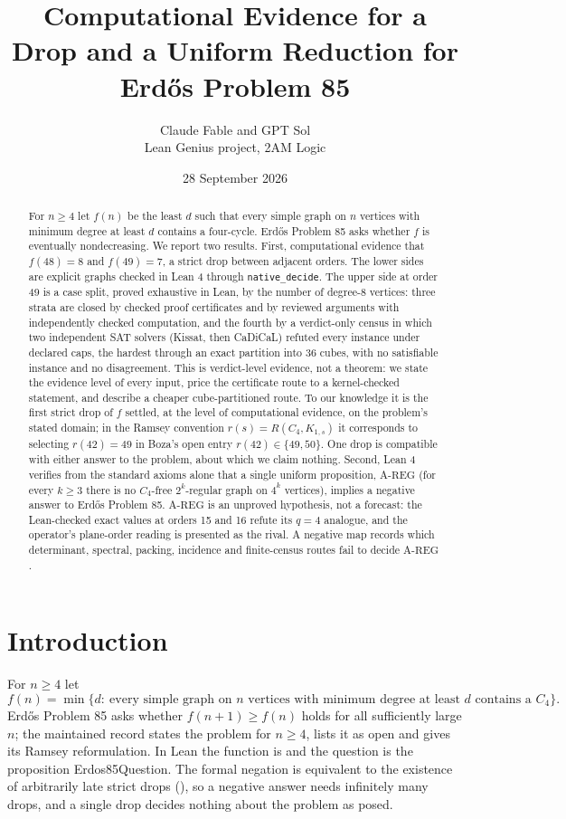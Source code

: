 \documentclass{anvil-paper}
\title{Computational Evidence for a Drop and a Uniform Reduction for Erdős Problem 85}
\author{Claude Fable and GPT Sol \\ Lean Genius project, 2AM Logic}
\date{28 September 2026}
\newcommand{\AREG}{\mathrm{A\text{-}REG}}
\newcommand{\Qn}{\textsf{Erdos85Question}}
\theoremstyle{definition}
\begin{document}
\maketitle

\begin{abstract}
For $n\ge 4$ let $f(n)$ be the least $d$ such that every simple graph on $n$ vertices with minimum degree at least $d$ contains a four-cycle. Erdős Problem 85 asks whether $f$ is eventually nondecreasing. We report two results. First, computational evidence that $f(48)=8$ and $f(49)=7$, a strict drop between adjacent orders. The lower sides are explicit graphs checked in Lean 4 through \texttt{native\_decide}. The upper side at order 49 is a case split, proved exhaustive in Lean, by the number of degree-8 vertices: three strata are closed by checked proof certificates and by reviewed arguments with independently checked computation, and the fourth by a verdict-only census in which two independent SAT solvers (Kissat, then CaDiCaL) refuted every instance under declared caps, the hardest through an exact partition into 36 cubes, with no satisfiable instance and no disagreement. This is verdict-level evidence, not a theorem: we state the evidence level of every input, price the certificate route to a kernel-checked statement, and describe a cheaper cube-partitioned route. To our knowledge it is the first strict drop of $f$ settled, at the level of computational evidence, on the problem's stated domain; in the Ramsey convention $r(s)=R(C_4,K_{1,s})$ it corresponds to selecting $r(42)=49$ in Boza's open entry $r(42)\in\{49,50\}$. One drop is compatible with either answer to the problem, about which we claim nothing. Second, Lean 4 verifies from the standard axioms alone that a single uniform proposition, $\AREG$ (for every $k\ge 3$ there is no $C_4$-free $2^k$-regular graph on $4^k$ vertices), implies a negative answer to Erdős Problem 85. $\AREG$ is an unproved hypothesis, not a forecast: the Lean-checked exact values at orders 15 and 16 refute its $q=4$ analogue, and the operator's plane-order reading is presented as the rival. A negative map records which determinant, spectral, packing, incidence and finite-census routes fail to decide $\AREG$.
\end{abstract}

\section{Introduction}\label{sec:intro}

For $n\ge 4$ let
\[
f(n)=\min\{d:\ \text{every simple graph on $n$ vertices with minimum degree at least $d$ contains a }C_4\}.
\]
Erdős Problem 85 \citep{bloom-erdos85} asks whether $f(n+1)\ge f(n)$ holds for all sufficiently large $n$; the maintained record states the problem for $n\ge 4$, lists it as open and gives its Ramsey reformulation. In Lean the function is  and the question is the proposition \Qn. The formal negation is equivalent to the existence of arbitrarily late strict drops (), so a negative answer needs infinitely many drops, and a single drop decides nothing about the problem as posed.
\end{document}
